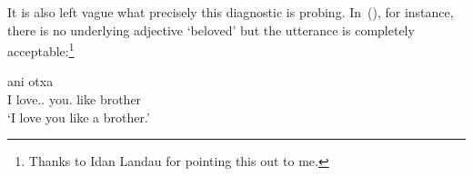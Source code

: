 \begin{exe}
\begin{xlist}
\begin{xlist}
\begin{exe}
\begin{exe}
\begin{xlist}
\begin{exe}
\begin{xlist}
\begin{exe}
\begin{xlist}
\begin{xlist}
\begin{exe}
\begin{xlist}
\begin{exe}
\begin{xlist}
\begin{exe}
\begin{exe}
\begin{exe}
\begin{xlist}
\begin{exe}
\begin{exe}
\begin{xlist}
\begin{xlist}
\begin{exe}
\begin{xlist}
\begin{exe}
\begin{exe}
\begin{exe}
\begin{xlist}
\begin{exe}
\begin{exe}
\begin{xlist}
\begin{exe}
\begin{xlist}
\begin{exe}
\begin{xlist}
\begin{exe}
\begin{xlist}
\begin{exe}
\begin{exe}
\begin{xlist}
\begin{exe}
\begin{exe}
\begin{xlist}
\begin{xlist}
\begin{exe}
\begin{xlist}
\begin{xlist}
\begin{exe}
\begin{xlist}
\begin{exe}
\begin{xlist}
\begin{exe}
\begin{xlist}
\begin{exe}
\begin{xlist}
\begin{exe}
\begin{exe}
\begin{exe}
\begin{exe}
\begin{xlist}
\begin{exe}
\begin{exe}
\begin{xlist}
\begin{xlist}
\begin{exe}
\begin{exe}
\begin{xlist}
\begin{exe}
\begin{xlist}
\begin{exe}
\begin{xlist}
\begin{exe}
\begin{xlist}
\begin{exe}
\begin{xlist}
\begin{exe}
\begin{exe}
\begin{exe}
\begin{exe}
\begin{xlist}
\begin{exe}
\begin{xlist}
\begin{exe}
\begin{xlist}
\begin{exe}
\begin{xlist}
\begin{exe}
\begin{xlist}
\begin{exe}
\begin{xlist}
{		}
	
 \z
\z 

It is also left vague what precisely this diagnostic is probing. In~(\nextx), for instance, there is no underlying adjective `beloved' but the utterance is completely acceptable:\footnote{Thanks to Idan Landau for pointing this out to me.}
 \begin{exe}
\ex  
	{ \gll ani  otxa  \\
 	  I love.. you. like brother\\
 	\glt `I love you like a brother.' } 
 \z 


\end{exe}
\end{xlist}
\end{exe}
\end{xlist}
\end{exe}
\end{xlist}
\end{exe}
\end{xlist}
\end{exe}
\end{xlist}
\end{exe}
\end{xlist}
\end{exe}
\end{exe}
\end{exe}
\end{exe}
\end{xlist}
\end{exe}
\end{xlist}
\end{exe}
\end{xlist}
\end{exe}
\end{xlist}
\end{exe}
\end{xlist}
\end{exe}
\end{exe}
\end{xlist}
\end{xlist}
\end{exe}
\end{exe}
\end{xlist}
\end{exe}
\end{exe}
\end{exe}
\end{exe}
\end{xlist}
\end{exe}
\end{xlist}
\end{exe}
\end{xlist}
\end{exe}
\end{xlist}
\end{exe}
\end{xlist}
\end{xlist}
\end{exe}
\end{xlist}
\end{xlist}
\end{exe}
\end{exe}
\end{xlist}
\end{exe}
\end{exe}
\end{xlist}
\end{exe}
\end{xlist}
\end{exe}
\end{xlist}
\end{exe}
\end{xlist}
\end{exe}
\end{exe}
\end{xlist}
\end{exe}
\end{exe}
\end{exe}
\end{xlist}
\end{exe}
\end{xlist}
\end{xlist}
\end{exe}
\end{exe}
\end{xlist}
\end{exe}
\end{exe}
\end{exe}
\end{xlist}
\end{exe}
\end{xlist}
\end{exe}
\end{xlist}
\end{xlist}
\end{exe}
\end{xlist}
\end{exe}
\end{xlist}
\end{exe}
\end{exe}
\end{xlist}
\end{xlist}
\end{exe}
